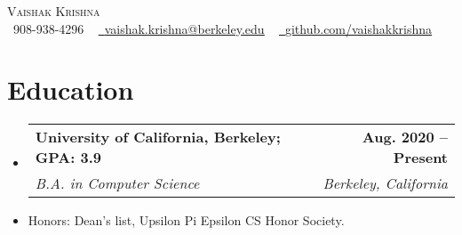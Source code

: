 \documentclass[letterpaper,11pt]{article}
\makeatletter
\newcommand{\resumeSubheading}[4]{
  \vspace{-2pt}\item
    \begin{tabular*}{1.0\textwidth}[t]{l@{\extracolsep{\fill}}r}
      \textbf{#1} & \textbf{\small #2} \\
      \textit{\small#3} & \textit{\small #4} \\
    \end{tabular*}\vspace{-7pt}
}
\newcommand{\resumeSubHeadingListStart}{\begin{itemize}[leftmargin=0.0in, label={}]}
\newcommand{\resumeSubHeadingListEnd}{\end{itemize}}
\makeatother
\begin{document}

\begin{center}
    {\Huge \scshape Vaishak Krishna} \\ \vspace{1pt}
    \small \raisebox{-0.1\height}\faPhone\ 908-938-4296 ~ \href{mailto:vaishak.krishna@berkeley.edu}{\raisebox{-0.2\height}\faEnvelope\  \underline{vaishak.krishna@berkeley.edu}} ~ 
    \href{https://github.com/vaishakkrishna}{\raisebox{-0.2\height}\faGithub\ \underline{github.com/vaishakkrishna}}
    \vspace{-8pt}
\end{center}


\section{Education}
  \resumeSubHeadingListStart
    \resumeSubheading
  {University of California, Berkeley; GPA: 3.9}{Aug. 2020 -- Present}
      {B.A. in Computer Science}{Berkeley, California}
    \vspace{-5pt}
      \item{Honors: Dean's list, Upsilon Pi Epsilon CS Honor Society.}

  \resumeSubHeadingListEnd
  
\vspace{-16pt}
\end{document}
